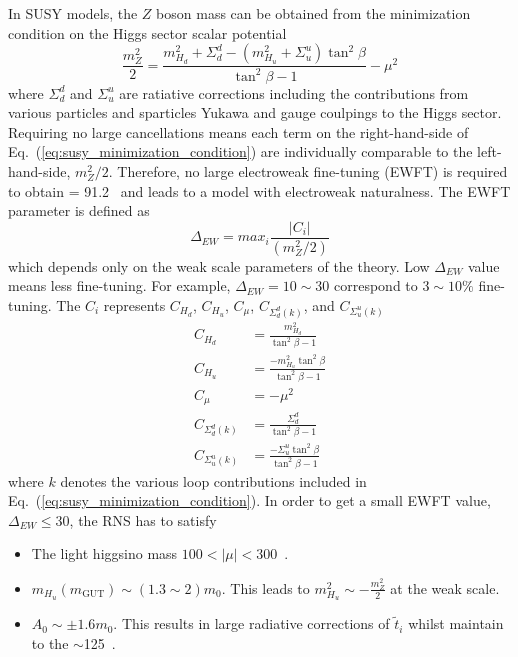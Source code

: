 In SUSY models, the $Z$ boson mass can be obtained from the minimization condition on the Higgs sector scalar potential
%
\begin{equation}
    \frac{m_{Z}^{2}}{2} = \frac{m^{2}_{H_{d}} + \Sigma^{d}_{d} - (m^{2}_{H_{u}} + \Sigma^{u}_{u})\tan^{2}\beta      }{\tan^{2}\beta - 1} - \mu^{2}
    \label{eq:susy_minimization_condition}
\end{equation}
%
where $\Sigma^{d}_{d}$ and $\Sigma^{u}_{u}$ are ratiative corrections including the contributions from various particles and sparticles Yukawa and gauge coulpings to the Higgs sector.
Requiring no large cancellations means each term on the right-hand-side of Eq.~(\ref{eq:susy_minimization_condition}) are individually comparable to the left-hand-side, $m_{Z}^{2}/2$.
Therefore, no large electroweak fine-tuning (EWFT) is required to obtain \mZ = 91.2~{\GeV} and leads to a model with electroweak naturalness.
The EWFT parameter is defined as
%
\begin{equation}
    \Delta_{EW} =  max_{i} \frac{|C_{i}|}{(m_{Z}^{2}/2)} 
    \label{eq:susy_ewft}
\end{equation}
%
which depends only on the weak scale parameters of the theory.
Low $\Delta_{EW}$ value means less fine-tuning.
For example, $\Delta_{EW} = 10 \sim 30$ correspond to $3 \sim 10 \%$ fine-tuning.
The $C_{i}$ represents $C_{H_{d}}$, $C_{H_{u}}$, $C_{\mu}$, $C_{\Sigma^{d}_{d}(k)}$, and $C_{\Sigma^{u}_{u}(k)}$
%
\begin{align}
    C_{H_{d}} &= \frac{m^{2}_{H_{d}}}{\tan^{2}\beta - 1}\\
    C_{H_{u}} &= \frac{-m^{2}_{H_{u}}\tan^{2}\beta}{\tan^{2}\beta - 1}\\
    C_{\mu} &= -\mu^{2}\\
    C_{\Sigma^{d}_{d}(k)} &= \frac{\Sigma^{d}_{d}}{\tan^{2}\beta - 1}\\
    C_{\Sigma^{u}_{u}(k)} &= \frac{-\Sigma^{u}_{u}\tan^{2}\beta}{\tan^{2}\beta - 1}
    \label{eq:susy_ci}
\end{align}
% 
where $k$ denotes the various loop contributions included in Eq.~(\ref{eq:susy_minimization_condition}).
In order to get a small EWFT value, $\Delta_{EW} \leq 30$, the RNS has to satisfy
%
\begin{itemize}
    \item The light higgsino mass $100 < |\mu| < 300$~{\GeV}. 
    \item $m_{H_{u}}(m_{\text{GUT}}) \sim (1.3 \sim 2) m_{0}$. This leads to $m^{2}_{H_{u}} \sim - \frac{m^{2}_{Z}}{2}$ at the weak scale.
    \item $A_{0} \sim \pm 1.6 m_{0}$. This results in large radiative corrections of $\widetilde{t}_{i}$ whilst maintain \mH to the $\sim$125~{\GeV}.
\end{itemize}
